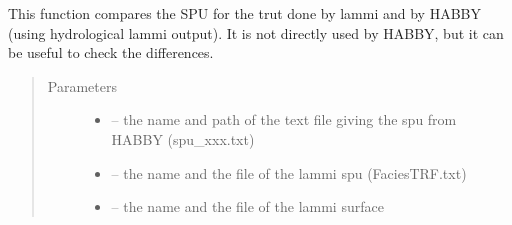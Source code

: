 \documentclass[letterpaper,10pt,english]{sphinxmanual}
\begin{document}

\begin{fulllineitems}
\label{\detokenize{index:src.lammi.compare_lammi}}
This function compares the SPU for the trut done by lammi and by HABBY (using hydrological lammi output). It is
not directly used by HABBY, but it can be useful to check the differences.
\begin{quote}\begin{description}
\item[{Parameters}] \leavevmode\begin{itemize}
\item {} 
 -- the name and path of the text file giving the spu from HABBY (spu\_xxx.txt)

\item {} 
 -- the name and the file of the lammi spu (FaciesTRF.txt)

\item {} 
 -- the name and the file of the lammi surface

\end{itemize}

\end{description}\end{quote}

\end{fulllineitems}

\end{document}
